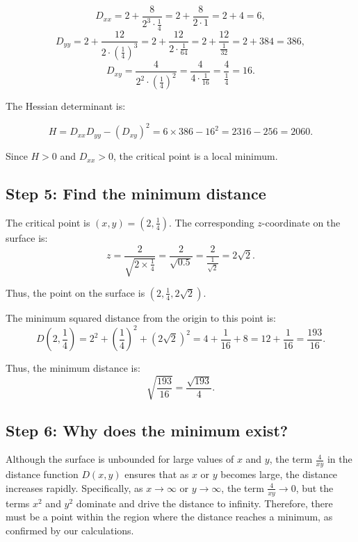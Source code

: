 \documentclass[11pt]{article}
\begin{document}
\[
D_{xx} = 2 + \frac{8}{2^3 \cdot \frac{1}{4}} = 2 + \frac{8}{2 \cdot 1} = 2 + 4 = 6,
\]
\[
D_{yy} = 2 + \frac{12}{2 \cdot \left( \frac{1}{4} \right)^3} = 2 + \frac{12}{2 \cdot \frac{1}{64}} = 2 + \frac{12}{\frac{1}{32}} = 2 + 384 = 386,
\]
\[
D_{xy} = \frac{4}{2^2 \cdot \left( \frac{1}{4} \right)^2} = \frac{4}{4 \cdot \frac{1}{16}} = \frac{4}{\frac{1}{4}} = 16.
\]

The Hessian determinant is:

\[
H = D_{xx}D_{yy} - (D_{xy})^2 = 6 \times 386 - 16^2 = 2316 - 256 = 2060.
\]

Since \( H > 0 \) and \( D_{xx} > 0 \), the critical point is a local minimum.

\newpage

\subsection{Step 5: Find the minimum distance}

The critical point is \( (x, y) = (2, \frac{1}{4}) \). The corresponding \( z \)-coordinate on the surface is:
\[
z = \frac{2}{\sqrt{2 \times \frac{1}{4}}} = \frac{2}{\sqrt{0.5}} = \frac{2}{\frac{1}{\sqrt{2}}} = 2\sqrt{2}.
\]

Thus, the point on the surface is \( (2, \frac{1}{4}, 2\sqrt{2}) \).

The minimum squared distance from the origin to this point is:
\[
D(2, \frac{1}{4}) = 2^2 + \left( \frac{1}{4} \right)^2 + \left( 2\sqrt{2} \right)^2 = 4 + \frac{1}{16} + 8 = 12 + \frac{1}{16} = \frac{193}{16}.
\]

Thus, the minimum distance is:
\[
\sqrt{\frac{193}{16}} = \frac{\sqrt{193}}{4}.
\]

\newpage

\subsection{Step 6: Why does the minimum exist?}

Although the surface is unbounded for large values of \( x \) and \( y \), the term \( \frac{4}{xy} \) in the distance function \( D(x, y) \) ensures that as \( x \) or \( y \) becomes large, the distance increases rapidly. Specifically, as \( x \to \infty \) or \( y \to \infty \), the term \( \frac{4}{xy} \to 0 \), but the terms \( x^2 \) and \( y^2 \) dominate and drive the distance to infinity. Therefore, there must be a point within the region where the distance reaches a minimum, as confirmed by our calculations.
\end{document}
